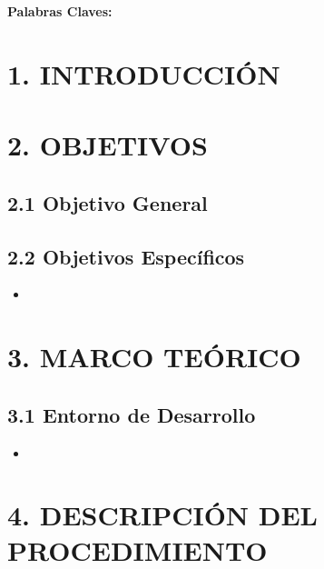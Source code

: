 \documentclass[12pt, a4paper]{article}
\begin{document}

\textbf{Palabras Claves:} 

\vspace{1cm}
    
\section*{1. INTRODUCCIÓN}


\section*{2. OBJETIVOS}

\subsection*{2.1 Objetivo General}


\subsection*{2.2 Objetivos Específicos}
\begin{itemize}
    \item 
\end{itemize}


\section*{3. MARCO TEÓRICO}

\subsection*{3.1 Entorno de Desarrollo}
\begin{itemize}
    \item 
\end{itemize}

\section*{4. DESCRIPCIÓN DEL PROCEDIMIENTO}
\end{document}
